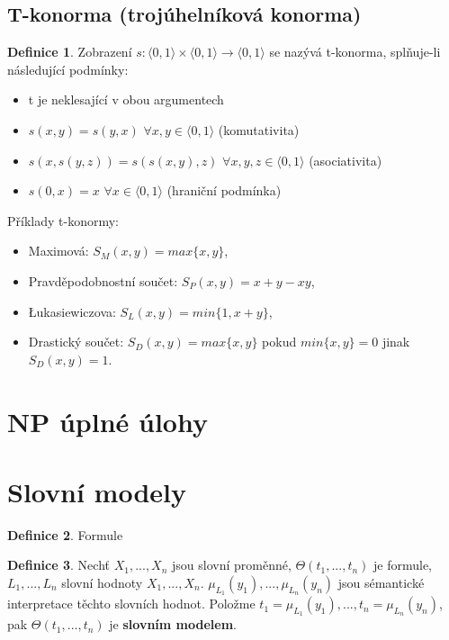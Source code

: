 \documentclass[a4]{report}
\theoremstyle{definition}
\newtheorem{definition}{Definice}[section]
\begin{document}
\subsection{T-konorma (trojúhelníková konorma)}

\begin{definition}
Zobrazení $s:\langle 0,1\rangle \times \langle 0,1\rangle \rightarrow \langle 0,1\rangle$ se nazývá t-konorma, splňuje-li následující podmínky:
\begin{itemize}
\item  t je neklesající v obou argumentech
\item  $s(x,y)=s(y,x)$  $\forall x,y\in \langle 0,1 \rangle$ (komutativita)
\item  $s(x,s(y,z))=s(s(x,y),z) $  $\forall x,y,z\in \langle 0,1 \rangle$ (asociativita)
\item $s(0,x)=x$  $\forall x\in \langle 0,1 \rangle$ (hraniční podmínka)
\end{itemize}
\end{definition}

Příklady t-konormy:
\begin{itemize}
\item Maximová: $S_M (x,y)=max\{x,y\}$, 
\item Pravděpodobnostní součet: $S_P(x,y)=x+y-xy$, 
\item Łukasiewiczova: $S_L (x,y)=min\{1,x+y\}$,
\item Drastický součet: $S_D(x,y)=max\{x,y\}$ pokud $min\{x,y\}=0$ jinak $S_D(x,y)=1$.
\end{itemize}







\section{NP úplné úlohy}

\section{Slovní modely}

\begin{definition}
Formule
\end{definition}

\begin{definition}
Nechť $X_1,...,X_n$ jsou slovní proměnné, $\Theta(t_1,...,t_n)$ je formule, $L_1,...,L_n$ slovní hodnoty $X_1,...,X_n$. $\mu_{L_1}(y_1),...,\mu_{L_n}(y_n)$ jsou sémantické interpretace těchto slovních hodnot. Položme $t_1=\mu_{L_1}(y_1),...,t_n=\mu_{L_n}(y_n)$, pak $\Theta(t_1,...,t_n)$ je \textbf{slovním modelem}. 
\end{definition}
\end{document}
